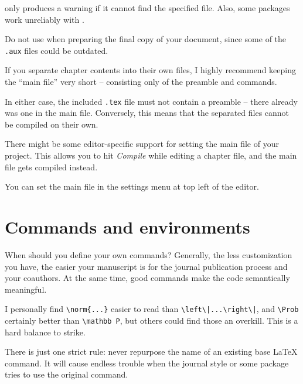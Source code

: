 \begin{gotcha}
 only produces a warning if it cannot find the specified file.
Also, some packages work unreliably with .

Do not use  when preparing the final copy of your document,
since some of the \verb|.aux| files could be outdated.
\end{gotcha}

\begin{practices}
If you separate chapter contents into their own files,
I highly recommend keeping the ``main file'' very short
-- consisting only of the preamble and  commands.
\end{practices}

In either case,
the included \verb|.tex| file must not contain a preamble --
there already was one in the main file.
Conversely, this means that the separated files cannot be compiled on their own.


There might be some editor-specific support for setting the main file of your project.
This allows you to hit \emph{Compile} while editing a chapter file,
and the main file gets compiled instead.

\begin{overleaf}
You can set the main file in the settings menu at top left of the editor.
\end{overleaf}




%
%
%
\section{Commands and environments}

\begin{practices}
When should you define your own commands?
Generally, the less customization you have,
the easier your manuscript is for the journal publication process and your coauthors.
At the same time, good commands make the code semantically meaningful.

I personally find \verb&\norm{...}& easier to read than \verb&\left\|...\right\|&,
and \verb|\Prob| certainly better than \verb|\mathbb P|,
but others could find those an overkill.
This is a hard balance to strike.

There is just one strict rule:
never repurpose the name of an existing base \LaTeX{} command.
It will cause endless trouble when the journal style or some package tries to use the original command.
\end{practices}


